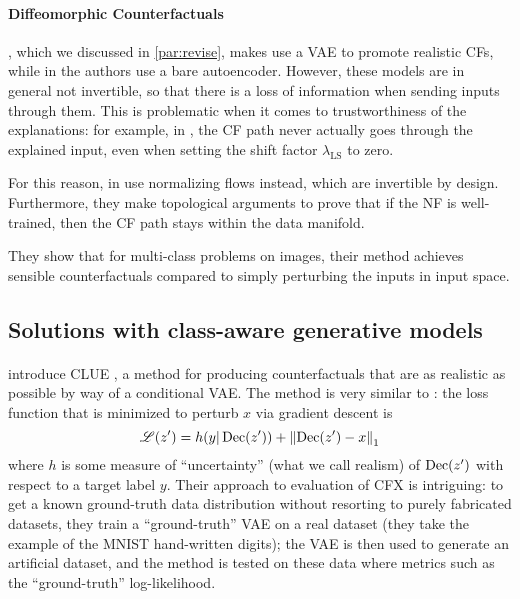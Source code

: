 \documentclass[../main.tex]{subfiles}
\begin{document}
\paragraph{Diffeomorphic Counterfactuals}

\revise{}, which we discussed in \autoref{par:revise}, makes use a VAE to promote realistic CFs, while in \ls{} the authors use a bare autoencoder.
However, these models are in general not invertible, so that there is a loss of information when sending inputs through them.
This is problematic when it comes to trustworthiness of the explanations: for example, in \ls{}, the CF path never actually goes through the explained input, even when setting the shift factor $\lambda_\text{LS}$ to zero.

For this reason, in \cite{dombrowskiDiffeomorphic2021} \citeauthor{dombrowskiDiffeomorphic2021} use normalizing flows instead, which are invertible by design.
Furthermore, they make topological arguments to prove that if the NF is well-trained, then the CF path stays within the data manifold.

They show that for multi-class problems on images, their method achieves sensible counterfactuals compared to simply perturbing the inputs in input space.

\subsection{Solutions with class-aware generative models}

\paragraph{}

\citeauthor{antoranGetting2021} introduce CLUE \cite{antoranGetting2021}, a method for producing counterfactuals that are as realistic as possible by way of a conditional VAE. The method is very similar to \revise: the loss function that is minimized to perturb $x$ via gradient descent is
\begin{equation}
    \mathscr{L}(z') = h(y | \operatorname{Dec}(z')) + \left\lVert\operatorname{Dec}(z') - x\right\rVert_1
\end{equation}
where $h$ is some measure of ``uncertainty'' (what we call realism) of $\operatorname{Dec}(z')$ with respect to a target label $y$.
Their approach to evaluation of CFX is intriguing:
to get a known ground-truth data distribution without resorting to purely fabricated datasets, they train a ``ground-truth'' VAE on a real dataset (they take the example of the MNIST hand-written digits); the VAE is then used to generate an artificial dataset, and the method is tested on these data where metrics such as the ``ground-truth'' log-likelihood.
\end{document}
